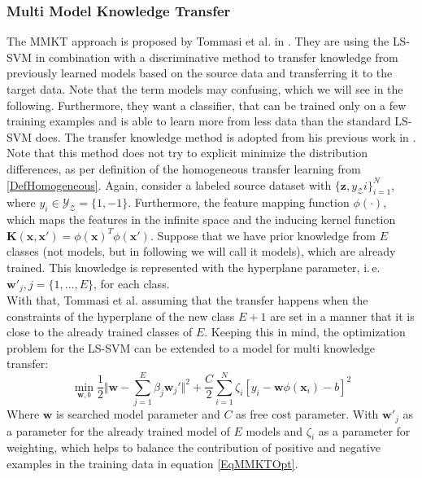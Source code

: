 \subsubsection{Multi Model Knowledge Transfer}
The \acs{MMKT} approach is proposed by Tommasi et al. in \cite{Tommasi.}.
They are using the \ac{LS-SVM} in combination with a discriminative method to transfer knowledge from previously learned models based on the source data and transferring it to the target data.
Note that the term models may confusing, which we will see in the following.
Furthermore, they want a classifier, that can be trained only on a few training examples and is able to learn more from less data than the standard \acs{LS-SVM} does.
The transfer knowledge method is adopted from his previous work in \cite{Tommasi.2009}.\\
Note that this method does not try to explicit minimize the distribution differences, as per definition of the homogeneous transfer learning from \ref{DefHomogeneous}.
Again, consider a labeled source dataset with $\{\mathbf{z},{y_\mathcal{Z}i}\}_{i=1}^{N}$, where $y_i \in \mathcal{Y_Z} =\{1,-1\}$.
Furthermore, the feature mapping function $\phi(\cdot)$, which maps the features in the infinite space and the inducing kernel function $\mathbf{K}(\mathbf{x},\mathbf{x}')=\phi(\mathbf{x})^T\phi(\mathbf{x}')$.
Suppose that we have prior knowledge from $E$ classes (not models, but in following we will call it models), which are already trained.
This knowledge is represented with the hyperplane parameter, i.\,e. $\mathbf{w}'_j, j = \{1,\dots,E\}$, for each class.\cite{Tommasi.}\\
With that, Tommasi et al. assuming that the transfer happens when the constraints of the hyperplane of the new class $E+1$ are set in a manner that it is close to the already trained classes of $E$.
Keeping this in mind, the optimization problem for the \acs{LS-SVM} can be extended to a model for multi knowledge transfer:\cite{Tommasi.}
\begin{equation}\label{EqMMKTOpt}
		\min_{\mathbf{w},b} \frac{1}{2}\Vert\mathbf{w}-\sum_{j=1}^{E}\beta_j\mathbf{w}_j'\Vert^2 + \frac{C}{2}\sum_{i=1}^{N}\zeta_i[y_i-\mathbf{w}\phi(\mathbf{x}_i)-b]^2
\end{equation}
Where $\mathbf{w}$ is searched model parameter and $C$ as free cost parameter. With $\mathbf{w}'_j$ as a parameter for the already trained model of $E$ models and $\zeta_i$ as a parameter for weighting, which helps to balance the contribution of positive and negative examples in the training data in equation \eqref{EqMMKTOpt}.

